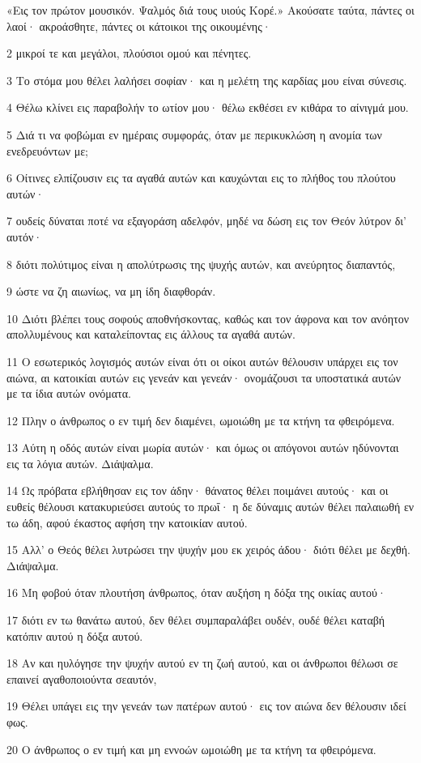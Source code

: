 \par «Εις τον πρώτον μουσικόν. Ψαλμός διά τους υιούς Κορέ.» Ακούσατε ταύτα, πάντες οι λαοί· ακροάσθητε, πάντες οι κάτοικοι της οικουμένης·
\par 2 μικροί τε και μεγάλοι, πλούσιοι ομού και πένητες.
\par 3 Το στόμα μου θέλει λαλήσει σοφίαν· και η μελέτη της καρδίας μου είναι σύνεσις.
\par 4 Θέλω κλίνει εις παραβολήν το ωτίον μου· θέλω εκθέσει εν κιθάρα το αίνιγμά μου.
\par 5 Διά τι να φοβώμαι εν ημέραις συμφοράς, όταν με περικυκλώση η ανομία των ενεδρευόντων με;
\par 6 Οίτινες ελπίζουσιν εις τα αγαθά αυτών και καυχώνται εις το πλήθος του πλούτου αυτών·
\par 7 ουδείς δύναται ποτέ να εξαγοράση αδελφόν, μηδέ να δώση εις τον Θεόν λύτρον δι' αυτόν·
\par 8 διότι πολύτιμος είναι η απολύτρωσις της ψυχής αυτών, και ανεύρητος διαπαντός,
\par 9 ώστε να ζη αιωνίως, να μη ίδη διαφθοράν.
\par 10 Διότι βλέπει τους σοφούς αποθνήσκοντας, καθώς και τον άφρονα και τον ανόητον απολλυμένους και καταλείποντας εις άλλους τα αγαθά αυτών.
\par 11 Ο εσωτερικός λογισμός αυτών είναι ότι οι οίκοι αυτών θέλουσιν υπάρχει εις τον αιώνα, αι κατοικίαι αυτών εις γενεάν και γενεάν· ονομάζουσι τα υποστατικά αυτών με τα ίδια αυτών ονόματα.
\par 12 Πλην ο άνθρωπος ο εν τιμή δεν διαμένει, ωμοιώθη με τα κτήνη τα φθειρόμενα.
\par 13 Αύτη η οδός αυτών είναι μωρία αυτών· και όμως οι απόγονοι αυτών ηδύνονται εις τα λόγια αυτών. Διάψαλμα.
\par 14 Ως πρόβατα εβλήθησαν εις τον άδην· θάνατος θέλει ποιμάνει αυτούς· και οι ευθείς θέλουσι κατακυριεύσει αυτούς το πρωΐ· η δε δύναμις αυτών θέλει παλαιωθή εν τω άδη, αφού έκαστος αφήση την κατοικίαν αυτού.
\par 15 Αλλ' ο Θεός θέλει λυτρώσει την ψυχήν μου εκ χειρός άδου· διότι θέλει με δεχθή. Διάψαλμα.
\par 16 Μη φοβού όταν πλουτήση άνθρωπος, όταν αυξήση η δόξα της οικίας αυτού·
\par 17 διότι εν τω θανάτω αυτού, δεν θέλει συμπαραλάβει ουδέν, ουδέ θέλει καταβή κατόπιν αυτού η δόξα αυτού.
\par 18 Αν και ηυλόγησε την ψυχήν αυτού εν τη ζωή αυτού, και οι άνθρωποι θέλωσι σε επαινεί αγαθοποιούντα σεαυτόν,
\par 19 Θέλει υπάγει εις την γενεάν των πατέρων αυτού· εις τον αιώνα δεν θέλουσιν ιδεί φως.
\par 20 Ο άνθρωπος ο εν τιμή και μη εννοών ωμοιώθη με τα κτήνη τα φθειρόμενα.

